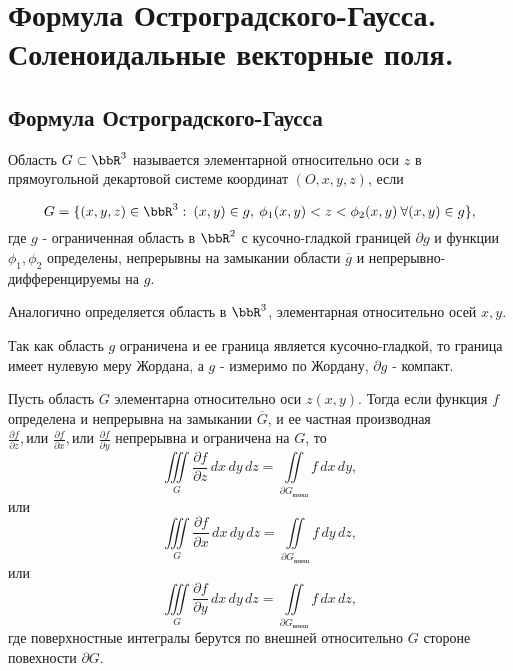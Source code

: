 \chapter{Формула Остроградского-Гаусса. Соленоидальные векторные поля.}
\section{Формула Остроградского-Гаусса}

\begin{defn}
Область $G \subset \bbR^3$ называется элементарной относительно оси $z$ в прямоугольной декартовой системе координат $(O, x, y, z)$, если 

\begin{equation} \label{ch15eq1}
G = \{ (x,y,z) \in \bbR^3: \: (x,y) \in g, \: \phi_1(x,y) < z < \phi_2(x,y) \: \forall (x,y) \in g\}, 
\end{equation}
где $g$ - ограниченная область в $\bbR^2$ с кусочно-гладкой границей $\partial g$ и функции $\phi_1, \phi_2$ определены, непрерывны на замыкании области $\overline{g}$ и непрерывно-дифференцируемы на $g$.
\end{defn}

Аналогично определяется область в $\bbR^3$, элементарная относительно осей $x,y$.

\begin{notion}
Так как область $g$ ограничена и ее граница является кусочно-гладкой, то граница имеет нулевую меру Жордана, а $g$ - измеримо по Жордану, $\partial g$ - компакт.
\end{notion}

\begin{lemm} \label{ch15lemm1}
Пусть область $G$ элементарна относительно оси $z(x,y)$. Тогда если функция $f$ определена и непрерывна на замыкании $\overline{G}$, и ее частная производная $\frac{\partial f}{\partial z}, \textit{или }\frac{\partial f}{\partial x}, \textit{или }\frac{\partial f}{\partial y}$ непрерывна и ограничена на $G$, то 
\begin{equation} \label{ch15eq2z}
\iiint\limits_{G} \frac{\partial f}{\partial z}\,dx\,dy\,dz = \iint\limits_{\partial	G_{\textit{внеш}}} f \,dx\,dy,
\end{equation}
или
\begin{equation} \label{ch15eq2x}
\iiint\limits_{G} \frac{\partial f}{\partial x}\,dx\,dy\,dz = \iint\limits_{\partial	G_{\textit{внеш}}} f \,dy\,dz,
\end{equation}
или
\begin{equation} \label{ch15eq2y}
\iiint\limits_{G} \frac{\partial f}{\partial y}\,dx\,dy\,dz = \iint\limits_{\partial	G_{\textit{внеш}}} f \,dx\,dz,
\end{equation}
где поверхностные интегралы берутся по внешней относительно $G$ стороне повехности $\partial G$.
\end{lemm}

